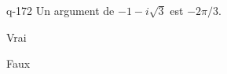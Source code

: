 \begin{truefalse}{q-172}
Un argument de $-1-i\sqrt 3$ est $-2\pi/3$.
\item* Vrai
\item Faux
\end{truefalse}

